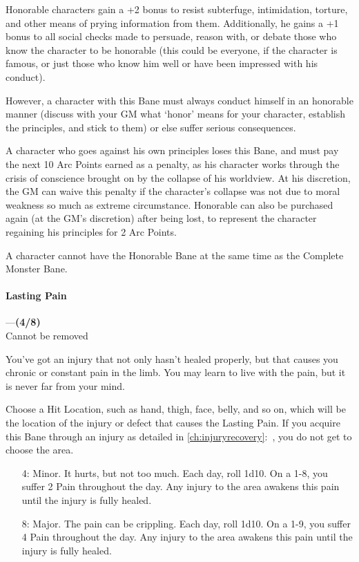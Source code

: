 \documentclass[oneside,11pt,english]{book}
\begin{document}
Honorable characters gain a +2 bonus to resist subterfuge, intimidation, torture, and other means of 
prying information from them. Additionally, he gains a +1 bonus to all social checks made to persuade, 
reason with, or debate those who know the character to be honorable (this could be everyone, if the 
character is famous, or just those who know him well or have been impressed with his conduct). 


However, a character with this Bane must always conduct himself in an honorable manner (discuss with 
your GM what ‘honor’ means for your character, establish the principles, and stick to them) or else suffer serious consequences. 


A character who goes against his own principles loses this Bane, and must pay the next 10 Arc Points 
earned as a penalty, as his character works through the crisis of conscience brought on by the collapse of 
his worldview. At his discretion, the GM can waive this penalty if the character's collapse was not due to 
moral weakness so much as extreme circumstance. Honorable can also be purchased again (at the GM's 
discretion) after being lost, to represent the character regaining his principles for 2 Arc Points. 
 
A character cannot have the Honorable Bane at the same time as the Complete Monster Bane. 
\paragraph{\label{bane:Lasting Pain}Lasting Pain}---\quad\textbf{(4/8) }\\
{Cannot be removed}\par
You've got an injury that not only hasn't healed properly, but that causes you chronic or constant pain in the limb. You may learn to live with the pain, but it is never far from your mind.


Choose a Hit Location, such as hand, thigh, face, belly, and so on, which will be the location of the injury or defect that causes the Lasting Pain. If you acquire this Bane through an injury as detailed in \autoref{ch:injuryrecovery}:~, you do not get to choose the area. 
\begin{itemize}
	\item [4:] Minor. It hurts, but not too much. Each day, roll 1d10. On a 1-8, you suffer 2 Pain throughout the day. Any injury to the area awakens this pain until the injury is fully healed. 
	\item [8:] Major. The pain can be crippling. Each day, roll 1d10. On a 1-9, you suffer 4 Pain throughout the day. Any injury to the area awakens this pain until the injury is fully healed.
\end{itemize}
\end{document}
